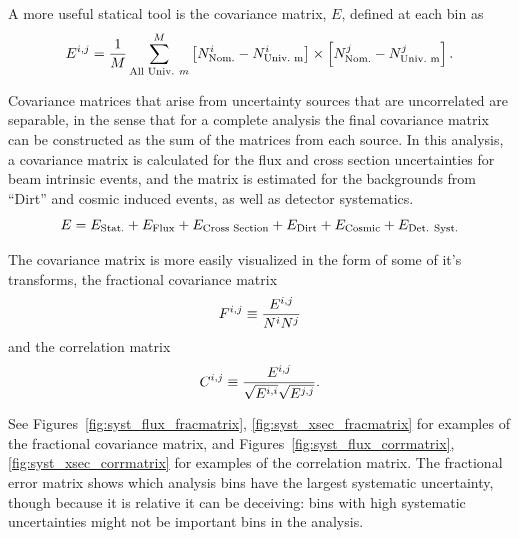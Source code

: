 A more useful statical tool is the covariance matrix, $E$, defined at each bin as
\begin{equation}
\begin{centering}
E^{i,j} = \frac{1}{M}\sum_{\text{All Univ.}~m}^{M} \left[ N^i_{\text{Nom.}} - N^i_{\text{Univ.~m}}\right] \times \left[ N^j_{\text{Nom.}} - N^j_{\text{Univ.~m}}\right].
\end{centering}
\label{eq:cov_mat}
\end{equation}

Covariance matrices that arise from uncertainty sources that are uncorrelated are separable, in the sense that for a complete analysis the final covariance matrix can be constructed as the sum of the matrices from each source.  In this analysis, a covariance matrix is calculated for the flux and cross section uncertainties for beam intrinsic events, and the matrix is estimated for the backgrounds from ``Dirt'' and cosmic induced events, as well as detector systematics.
\begin{equation}
\begin{centering}
\label{eq:tot_cov_mat}
E = E_{\text{Stat.}} + E_{\text{Flux}} + E_{\text{Cross Section}} + E_{\text{Dirt}} + E_{\text{Cosmic}} + E_{\text{Det. Syst.}}
\end{centering}
\end{equation}

The covariance matrix is more easily visualized in the form of some of it's transforms, the fractional covariance matrix
\begin{equation}
\begin{centering}
F^{i,j} \equiv \frac{E^{i,j}}{N^{i} N^{j}}
\end{centering}
\end{equation}
and the correlation matrix
\begin{equation}
\begin{centering}
C^{i,j} \equiv \frac{ E^{i,j} }{ \sqrt{E^{i,i}} \sqrt{E^{j,j}} }.
\end{centering}
\end{equation}

See Figures~\ref{fig:syst_flux_fracmatrix}, \ref{fig:syst_xsec_fracmatrix} for examples of the fractional covariance matrix, and Figures~\ref{fig:syst_flux_corrmatrix}, \ref{fig:syst_xsec_corrmatrix} for examples of the correlation matrix.  The fractional error matrix shows which analysis bins have the largest systematic uncertainty, though because it is relative it can be deceiving: bins with high systematic uncertainties might not be important bins in the analysis. 

